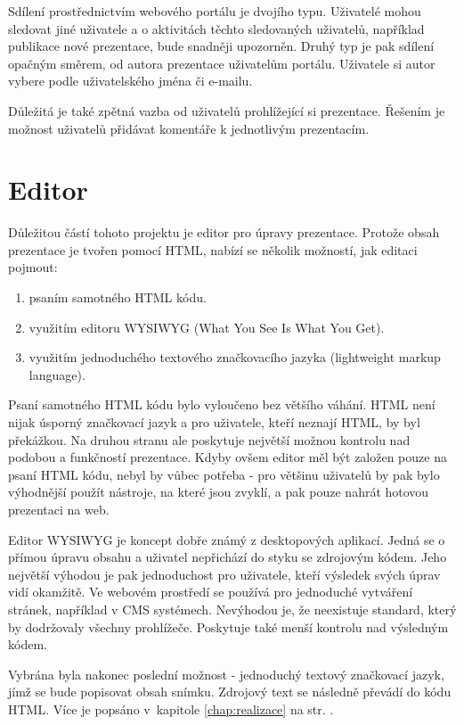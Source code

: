 \documentclass[11pt,twoside,a4paper]{book}
\begin{document}
Sdílení prostřednictvím webového portálu je dvojího typu. Uživatelé mohou sledovat jiné uživatele a o aktivitách těchto sledovaných uživatelů, například publikace nové prezentace, bude snadněji upozorněn. Druhý typ je pak sdílení opačným směrem, od autora prezentace uživatelům portálu. Uživatele si autor vybere podle uživatelského jména či e-mailu.

Důležitá je také zpětná vazba od uživatelů prohlížející si prezentace. Řešením je možnost uživatelů přidávat komentáře k jednotlivým prezentacím.

\section{Editor}
Důležitou částí tohoto projektu je editor pro úpravy prezentace. Protože obsah prezentace je tvořen pomocí HTML, nabízí se
několik možností, jak editaci pojmout:

\begin{enumerate}
	\item psaním samotného HTML kódu.
	\item využitím editoru WYSIWYG (What You See Is What You Get).
	\item využitím jednoduchého textového značkovacího jazyka (lightweight markup language).
\end{enumerate}

Psaní samotného HTML kódu bylo vyloučeno bez většího váhání. HTML není nijak úsporný značkovací jazyk a pro uživatele, kteří neznají HTML, by byl překážkou. Na druhou stranu ale poskytuje největší možnou kontrolu nad podobou a funkčností prezentace. Kdyby ovšem editor měl být založen pouze na psaní HTML kódu, nebyl by vůbec potřeba - pro většinu uživatelů by pak bylo výhodnější použít nástroje, na které jsou zvyklí, a pak pouze nahrát hotovou prezentaci na web.

Editor WYSIWYG je koncept dobře známý z desktopových aplikací. Jedná se o přímou úpravu obsahu a uživatel nepřichází do styku se zdrojovým kódem. Jeho největší výhodou je pak jednoduchost pro uživatele, kteří výsledek svých úprav vidí okamžitě. Ve webovém prostředí se používá pro jednoduché vytváření stránek, například v CMS systémech. Nevýhodou je, že neexistuje standard, který by dodržovaly všechny prohlížeče. Poskytuje také menší kontrolu nad výsledným kódem. 

Vybrána byla nakonec poslední možnost - jednoduchý textový značkovací jazyk, jímž se bude popisovat obsah snímku. Zdrojový text se následně převádí do kódu HTML. Více je popsáno v~kapitole \ref{chap:realizace}  na str. \pageref{chap:realizace}.
\end{document}
